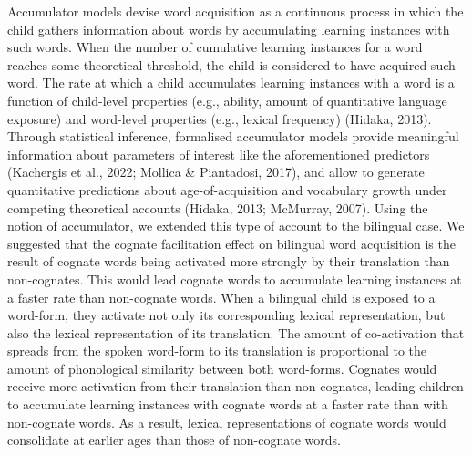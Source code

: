\documentclass[
  12pt,
  b5paperpaper,
  twoside]{scrreprt}
\begin{document}
Accumulator models devise word acquisition as a continuous process in
which the child gathers information about words by accumulating learning
instances with such words. When the number of cumulative learning
instances for a word reaches some theoretical threshold, the child is
considered to have acquired such word. The rate at which a child
accumulates learning instances with a word is a function of child-level
properties (e.g., ability, amount of quantitative language exposure) and
word-level properties (e.g., lexical frequency) (Hidaka, 2013). Through
statistical inference, formalised accumulator models provide meaningful
information about parameters of interest like the aforementioned
predictors (Kachergis et al., 2022; Mollica \& Piantadosi, 2017), and
allow to generate quantitative predictions about age-of-acquisition and
vocabulary growth under competing theoretical accounts (Hidaka, 2013;
McMurray, 2007). Using the notion of accumulator, we extended this type
of account to the bilingual case. We suggested that the cognate
facilitation effect on bilingual word acquisition is the result of
cognate words being activated more strongly by their translation than
non-cognates. This would lead cognate words to accumulate learning
instances at a faster rate than non-cognate words. When a bilingual
child is exposed to a word-form, they activate not only its
corresponding lexical representation, but also the lexical
representation of its translation. The amount of co-activation that
spreads from the spoken word-form to its translation is proportional to
the amount of phonological similarity between both word-forms. Cognates
would receive more activation from their translation than non-cognates,
leading children to accumulate learning instances with cognate words at
a faster rate than with non-cognate words. As a result, lexical
representations of cognate words would consolidate at earlier ages than
those of non-cognate words.
\end{document}
